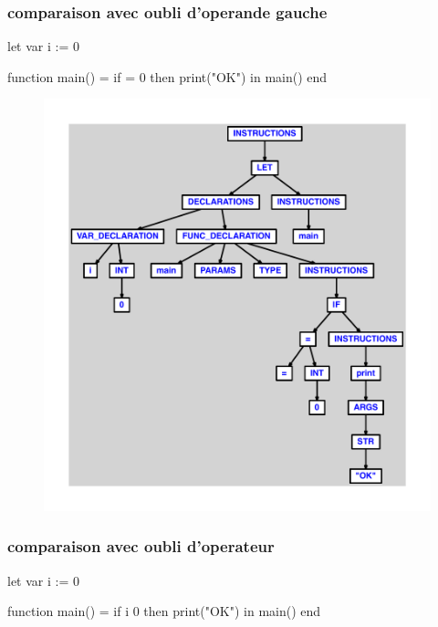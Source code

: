 \documentclass{article}
\begin{document}
\subsubsection{comparaison avec oubli d'operande gauche}
\begin{verbatimtab}
let
	var i := 0

	function main() =
		if = 0 then print("OK")
in main() end
\end{verbatimtab}
\begin{figure}[H]\centering\includegraphics[max width=\textwidth]{ast/ast_164.pdf}\end{figure}\subsubsection{comparaison avec oubli d'operateur}
\begin{verbatimtab}
let
	var i := 0

	function main() =
		if i 0 then print("OK")
in main() end
\end{verbatimtab}
\end{document}
